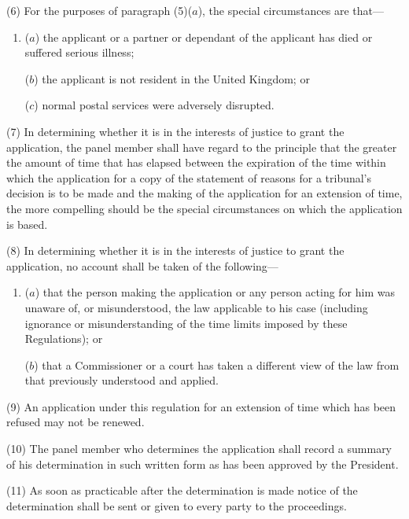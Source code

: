 \documentclass[12pt,a4paper]{article}
\begin{document}
(6) For the purposes of paragraph (5)($a$), the special circumstances are that—
\begin{enumerate}\item[]
($a$) the applicant or a 
partner  %
or dependant of the applicant has died or suffered serious illness;

($b$) the applicant is not resident in the United Kingdom; or

($c$) normal postal services were adversely disrupted.
\end{enumerate}

(7) In determining whether it is in the interests of justice to grant the application, the panel member shall have regard to the principle that the greater the amount of time that has elapsed between the expiration of the time within which the application for a copy of the statement of reasons for a tribunal’s decision is to be made and the making of the application for an extension of time, the more compelling should be the special circumstances on which the application is based.

(8) In determining whether it is in the interests of justice to grant the application, no account shall be taken of the following—
\begin{enumerate}\item[]
($a$) that the person making the application or any person acting for him was unaware of, or misunderstood, the law applicable to his case (including ignorance or misunderstanding of the time limits imposed by these Regulations); or

($b$) that a Commissioner or a court has taken a different view of the law from that previously understood and applied.
\end{enumerate}

(9) An application under this regulation for an extension of time which has been refused may not be renewed.

(10) The panel member who determines the application shall record a summary of his 
determination  %
in such written form as has been approved by the President.

(11) As soon as practicable after the 
determination  %
is made 
notice  %
of the 
determination  %
shall be sent or given to every party to the proceedings.
\end{document}
